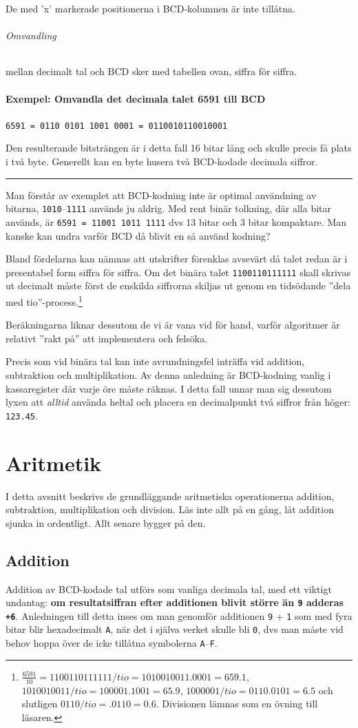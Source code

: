 \documentclass[oneside,10pt,a4paper,swedish]{scrbook}
\newcommand{\startex}[1]{\subsubsection{Exempel: #1}}
\newcommand{\slutex}{\vspace{-8mm}\begin{flushright} \rule{1ex}{1ex} \end{flushright}}
\newcommand{\asm}[1]{\texttt{#1}}
\begin{document}
De med 'x' markerade positionerna i BCD-kolumnen är inte tillåtna.

\subparagraph{Omvandling} mellan decimalt tal och BCD sker med tabellen ovan, siffra för siffra.

\startex{Omvandla det decimala talet 6591 till BCD}

\begin{center}
\asm{6591 = 0110 0101 1001 0001 =  0110010110010001}
\end{center}

Den resulterande bitsträngen är i detta fall 16 bitar lång och skulle precis få plats i två byte. Generellt kan en byte husera två BCD-kodade decimala siffror.
\slutex

Man förstår av exemplet att BCD-kodning inte är optimal användning av bitarna, \asm{1010}--\asm{1111} används ju aldrig. Med rent binär tolkning, där alla bitar används, är \asm{6591 = 11001 1011 1111} dvs 13 bitar och 3 bitar kompaktare. Man kanske kan undra varför BCD då blivit en så använd kodning?

Bland fördelarna kan nämnas att utskrifter förenklas avsevärt då talet redan är i presentabel form siffra för siffra. Om det binära talet \asm{1100110111111} skall skrivas ut decimalt måste först de enskilda siffrorna skiljas ut genom en tidsödande ''dela med tio''-process.\footnote{$\frac{6591}{10}=1100110111111/tio=1010010011.0001=659.1$, $1010010011/tio=100001.1001= 65.9$, $1000001/tio=0110.0101=6.5$ och slutligen $0110/tio=.0110=0.6$. Divisionen lämnas som en övning till läsaren.}

Beräkningarna liknar dessutom de vi är vana vid för hand, varför algoritmer är relativt ''rakt på'' att implementera och felsöka.

Precis som vid binära tal kan inte avrundningsfel inträffa vid addition, subtraktion och multiplikation. Av denna anledning är BCD-kodning vanlig i kassaregister där varje öre måste räknas. I detta fall unnar man sig dessutom lyxen att \emph{alltid} använda heltal och placera en decimalpunkt två siffror från höger: \asm{123.45}.

\chapter{Aritmetik} I detta avsnitt beskrivs de grundläggande aritmetiska operationerna addition, subtraktion, multiplikation och division. Läs inte allt på en gång, låt addition sjunka in ordentligt. Allt senare bygger på den.

\section{Addition} Addition av BCD-kodade tal utförs som vanliga decimala tal, med ett viktigt undantag: \textbf{om resultatsiffran efter additionen blivit större än \asm{9} adderas \asm{+6}}. Anledningen till detta inses om man genomför additionen \asm{9} + \asm{1} som med fyra bitar blir hexadecimalt \asm{A}, när det i själva verket skulle bli \asm{0}, dvs man måste vid behov hoppa över de icke tillåtna symbolerna \asm{A}--\asm{F}.
\end{document}
